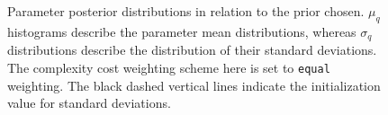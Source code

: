 %
\begin{figure}[H]
	\centering
	
	
	
	
	
	\caption{Parameter posterior distributions in relation to the prior chosen. $\mu_q$ histograms describe the parameter mean distributions, whereas $\sigma_q$ distributions describe the distribution of their standard deviations. The complexity cost weighting scheme here is set to \texttt{equal} weighting. The black dashed vertical lines indicate the initialization value for standard deviations.}
	\label{fig:bcnn-prior-weights}
\end{figure}
%





